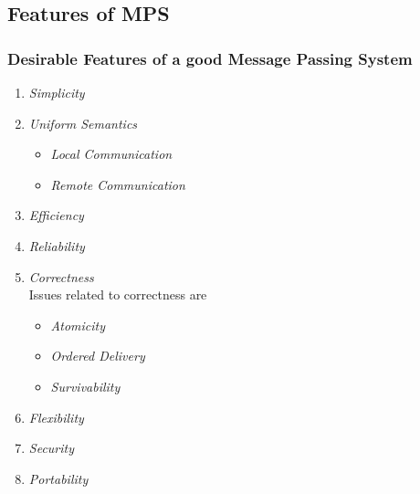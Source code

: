 \documentclass{beamer}
\begin{document}
\subsection{Features of MPS}
\begin{frame}
	\frametitle{Desirable Features of a good Message Passing System}
	\begin{enumerate}
		\item \textit{Simplicity}
		\item \textit{Uniform Semantics}
		\begin{itemize}
			\item \textit{Local Communication}
			\item \textit{Remote Communication}
		\end{itemize}
		\item \textit{Efficiency}
		\item \textit{Reliability}
		\item \textit{Correctness}\\
			Issues related to correctness are
		\begin{itemize}
			\item \textit{Atomicity}
			\item \textit{Ordered Delivery}
			\item \textit{Survivability}
		\end{itemize}
		\item \textit{Flexibility}
		\item \textit{Security}
		\item \textit{Portability}
	\end{enumerate}
\end{frame}
\end{document}
